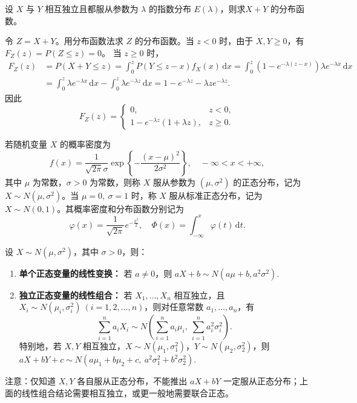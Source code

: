 \documentclass[lang=cn,11pt]{elegantbook}
\begin{document}
\begin{exercise}\label{exer:src-paper3-i-04}\label{prob:p3-i-04}
设 \(X\) 与 \(Y\) 相互独立且都服从参数为 \(\lambda\) 的指数分布 \(E(\lambda)\)，则求\(X+Y\) 的分布函数。
\end{exercise}
\begin{solution}
令 \(Z=X+Y\)。用分布函数法求 \(Z\) 的分布函数。当 \(z<0\) 时，由于 \(X,Y\ge0\)，有 \(F_Z(z)=P(Z\le z)=0\)。
当 \(z\ge0\) 时，
\[
\begin{aligned}
F_Z(z)
&=P(X+Y\le z)=\int_0^z P(Y\le z-x)f_X(x)\,\mathrm{d}x=\int_0^z \left(1-e^{-\lambda(z-x)}\right)\lambda e^{-\lambda x}\,\mathrm{d}x\\
&=\int_0^z \lambda e^{-\lambda x}\,\mathrm{d}x-\int_0^z \lambda e^{-\lambda z}\,\mathrm{d}x=1-e^{-\lambda z}-\lambda z e^{-\lambda z}.
\end{aligned}
\]
因此
\[
F_Z(z)=
\begin{cases}
0, & z<0,\\
1-e^{-\lambda z}(1+\lambda z), & z\ge0.
\end{cases}
\]
\end{solution}

\begin{definition}[正态分布]\label{def:normal-dist}
若随机变量 $X$ 的概率密度为
\[
f(x) = \frac{1}{\sqrt{2\pi}\sigma} \exp\left\{-\frac{(x-\mu)^2}{2\sigma^2}\right\},\quad -\infty < x < +\infty,
\]
其中 $\mu$ 为常数，$\sigma > 0$ 为常数，则称 $X$ 服从参数为 $(\mu,\sigma^2)$ 的正态分布，记为 $X \sim N(\mu,\sigma^2)$。当 $\mu = 0,\ \sigma = 1$ 时，称 $X$ 服从标准正态分布，记为 $X \sim N(0,1)$。其概率密度和分布函数分别记为
\[
\varphi(x) = \frac{1}{\sqrt{2\pi}} e^{-\frac{x^2}{2}},\quad \Phi(x) = \int_{-\infty}^x \varphi(t)\,\mathrm{d}t.
\]
\end{definition}



\begin{property}[正态分布的常用性质]\label{prop:normal-properties}
设 \(X\sim N(\mu,\sigma^2)\)，其中 \(\sigma>0\)，则：
\begin{enumerate}
    \item \textbf{单个正态变量的线性变换：} 若 \(a\ne0\)，则
    \(
    aX+b\sim N(a\mu+b,a^2\sigma^2).
    \)
    \item \textbf{独立正态变量的线性组合：} 若 \(X_1,\dots,X_n\) 相互独立，且 \(X_i\sim N(\mu_i,\sigma_i^2)\ (i=1,2,\dots,n)\)，则对任意常数 \(a_1,\dots,a_n\)，有
    \[
    \sum_{i=1}^n a_iX_i
    \sim
    N\left(\sum_{i=1}^n a_i\mu_i,\ \sum_{i=1}^n a_i^2\sigma_i^2\right).
    \]
    特别地，若 \(X,Y\) 相互独立，\(X\sim N(\mu_1,\sigma_1^2)\)，\(Y\sim N(\mu_2,\sigma_2^2)\)，则
    \(
    aX+bY+c\sim N(a\mu_1+b\mu_2+c,\ a^2\sigma_1^2+b^2\sigma_2^2).
    \)
\end{enumerate}

注意：仅知道 \(X,Y\) 各自服从正态分布，不能推出 \(aX+bY\) 一定服从正态分布；上面的线性组合结论需要相互独立，或更一般地需要联合正态。
\end{property}
\end{document}
